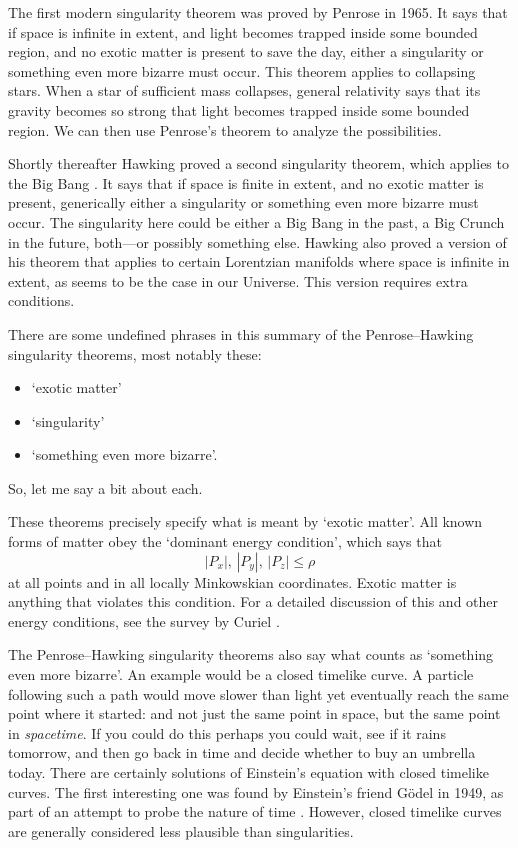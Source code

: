 \documentclass[12pt]{article}
\begin{document}
The first modern singularity theorem was proved by Penrose \cite{Penrose1965} in 1965.  It says that if space is infinite in extent, and light becomes trapped inside some bounded region, and no exotic matter is present to save the day, either a singularity or something even more bizarre must occur.   This theorem applies to collapsing stars.   When a star of sufficient mass collapses, general relativity says that its gravity becomes so strong that light becomes trapped inside some bounded region.   We can then use Penrose's theorem to analyze the possibilities.

Shortly thereafter Hawking proved a second singularity theorem, which applies to the Big Bang \cite{Hawking1966}.   It says that if space is finite in extent, and no exotic matter is present, generically either a singularity or something even more bizarre must occur.  The singularity here could be either a Big Bang in the past, a Big Crunch in the future, both---or possibly something else.  Hawking also proved a version of his theorem that applies to certain Lorentzian manifolds where space is infinite in extent, as seems to be the case in our Universe.  This version requires extra conditions.

There are some undefined phrases in this summary of the Penrose--Hawking singularity theorems, most notably these:
\begin{itemize}
\item `exotic matter'
\item `singularity'
\item `something even more bizarre'.
\end{itemize}
So, let me say a bit about each.

These theorems precisely specify what is meant by `exotic matter'.  All known forms of matter obey the `dominant energy condition', which says that
\[       |P_x|, \, |P_y|, \, |P_z| \le \rho \]
at all points and in all locally Minkowskian coordinates.  Exotic matter is anything that violates this condition.  For a detailed discussion of this and other energy conditions, see the survey by Curiel \cite{Curiel}.

The Penrose--Hawking singularity theorems also say what counts as `something even more bizarre'.  An example would be a closed timelike curve.   A particle following such a path would move slower than light yet eventually reach the same point where it started: and not just the same point in space, but the same point in \emph{spacetime}.  If you could do this perhaps you could wait, see if it rains tomorrow, and then go back in time and decide whether to buy an umbrella today.  There are certainly solutions of Einstein's equation with closed timelike curves.  The first interesting one was found by Einstein's friend G\"odel in 1949, as part of an attempt to probe the nature of time \cite{Goedel}.  However, closed timelike curves are generally considered less plausible than singularities.
\end{document}
